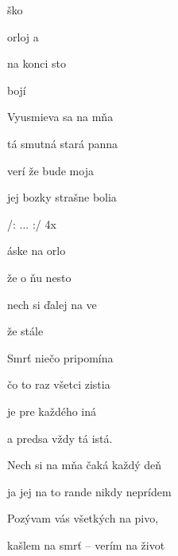 
\zs
{}  ško

orloj a 

na konci  sto

 bojí 
\ks

\zs
Vyusmieva sa na mňa

tá smutná stará panna

verí že bude moja

jej bozky strašne bolia
\ks

\zr
/: ...      :/ 4x

áske na  orlo

 že o ňu  nesto

nech si ďalej  na ve

 že  stále 
\kr

\zs
Smrť niečo pripomína

čo to raz všetci zistia

je pre každého iná

a predsa vždy tá istá.
\ks

\zr \kr

\zr
Nech si na mňa čaká každý deň

ja jej na to rande nikdy neprídem

Pozývam vás všetkých na pivo,

kašlem na smrť -- verím na život
\kr

\kp



